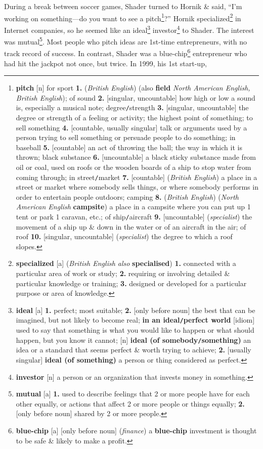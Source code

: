 \documentclass[oneside]{book}
\numberwithin{equation}{section}
\begin{document}
During a break between soccer games, Shader turned to Hornik \& said, ``I'm working on something---do you want to see a pitch\footnote{\textbf{pitch} [n] \textsf{for sport} \textbf{1.} (\textit{British English}) (also \textbf{field} \textit{North American English, British English}); \textsf{of sound} \textbf{2.} [singular, uncountable] how high or low a sound is, especially a musical note; \textsf{degree\texttt{/}strength} \textbf{3.} [singular, uncountable] the degree or strength of a feeling or activity; the highest point of something; \textsf{to sell something} \textbf{4.} [countable, usually singular] talk or arguments used by a person trying to sell something or persuade people to do something; \textsf{in baseball} \textbf{5.} [countable] an act of throwing the ball; the way in which it is thrown; \textsf{black substance} \textbf{6.} [uncountable] a black sticky substance made from oil or coal, used on roofs or the wooden boards of a ship to stop water from coming through; \textsf{in street\texttt{/}market} \textbf{7.} [countable] (\textit{British English}) a place in a street or market where somebody sells things, or where somebody performs in order to entertain people outdoors; \textsf{camping} \textbf{8.} (\textit{British English}) (\textit{North American English} \textbf{campsite}) a place in a campsite where you can put up 1 tent or park 1 caravan, etc.; \textsf{of ship\texttt{/}aircraft} \textbf{9.} [uncountable] (\textit{specialist}) the movement of a ship up \& down in the water or of an aircraft in the air; \textsf{of roof} \textbf{10.} [singular, uncountable] (\textit{specialist}) the degree to which a roof slopes.}?'' Hornik specialized\footnote{\textbf{specialized} [a] (\textit{British English also} \textbf{specialised}) \textbf{1.} connected with a particular area of work or study; \textbf{2.} requiring or involving detailed \& particular knowledge or training; \textbf{3.} designed or developed for a particular purpose or area of knowledge.} in Internet companies, so he seemed like an ideal\footnote{\textbf{ideal} [a] \textbf{1.} perfect; most suitable; \textbf{2.} [only before noun] the best that can be imagined, but not likely to become real; \textbf{in an ideal\texttt{/}perfect world} [idiom] used to say that something is what you would like to happen or what should happen, but you know it cannot; [n] \textbf{ideal (of somebody\texttt{/}something)} an idea or a standard that seems perfect \& worth trying to achieve; \textbf{2.} [usually singular] \textbf{ideal (of something)} a person or thing considered as perfect.} investor\footnote{\textbf{investor} [n] a person or an organization that invests money in something.} to Shader. The interest was mutual\footnote{\textbf{mutual} [a] \textbf{1.} used to describe feelings that 2 or more people have for each other equally, or actions that affect 2 or more people or things equally; \textbf{2.} [only before noun] shared by 2 or more people.}. Most people who pitch ideas are 1st-time entrepreneurs, with no track record of success. In contrast, Shader was a blue-chip\footnote{\textbf{blue-chip} [a] [only before noun] (\textit{finance}) a \textbf{blue-chip} investment is thought to be safe \& likely to make a profit.} entrepreneur who had hit the jackpot not once, but twice. In 1999, his 1st start-up, 
\end{document}
